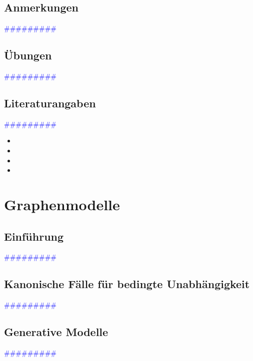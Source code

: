 \documentclass{article}
\begin{document}
  \subsection{Anmerkungen} %
      \textcolor{blue}{\#\#\#\#\#\#\#\#\#}
  \subsection{Übungen} %
      \textcolor{blue}{\#\#\#\#\#\#\#\#\#}
  \subsection{Literaturangaben} %
      \textcolor{blue}{\#\#\#\#\#\#\#\#\#}

      \begin{itemize}
      \color{red}
        \item 
        \item
      \color{ForestGreen}
        \item 
        \item
      \end{itemize}




\newpage
\section{Graphenmodelle} %
  \subsection{Einführung} %
      \textcolor{blue}{\#\#\#\#\#\#\#\#\#}
  \subsection{Kanonische Fälle für bedingte Unabhängigkeit} %
      \textcolor{blue}{\#\#\#\#\#\#\#\#\#}
  \subsection{Generative Modelle} %
      \textcolor{blue}{\#\#\#\#\#\#\#\#\#}
\end{document}
